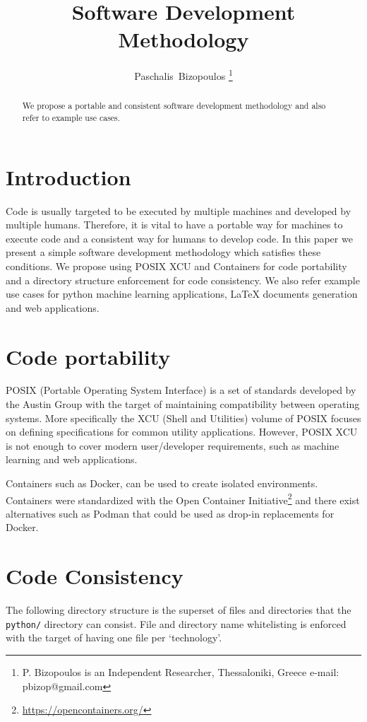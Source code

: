\documentclass[journal]{IEEEtran}
\begin{document}
\title{Software Development Methodology}

\author{Paschalis~Bizopoulos
\thanks{P. Bizopoulos is an Independent Researcher, Thessaloniki, Greece e-mail: pbizop@gmail.com}}

\maketitle

\begin{abstract}
	We propose a portable and consistent software development methodology and also refer to example use cases.
\end{abstract}

\section{Introduction}
Code is usually targeted to be executed by multiple machines and developed by multiple humans.
Therefore, it is vital to have a portable way for machines to execute code and a consistent way for humans to develop code.
In this paper we present a simple software development methodology which satisfies these conditions.
We propose using POSIX XCU and Containers for code portability and a directory structure enforcement for code consistency.
We also refer example use cases for python machine learning applications, \LaTeX{} documents generation and web applications.

\section{Code portability}
POSIX (Portable Operating System Interface) is a set of standards developed by the Austin Group with the target of maintaining compatibility between operating systems.
More specifically the XCU (Shell and Utilities) volume of POSIX focuses on defining specifications for common utility applications.
However, POSIX XCU is not enough to cover modern user/developer requirements, such as machine learning and web applications.

Containers such as Docker, can be used to create isolated environments.
Containers were standardized with the Open Container Initiative\footnote{\url{https://opencontainers.org/}} and there exist alternatives such as Podman that could be used as drop-in replacements for Docker.

\section{Code Consistency}
The following directory structure is the superset of files and directories that the \texttt{python/} directory can consist.
File and directory name whitelisting is enforced with the target of having one file per `technology'.
\end{document}
